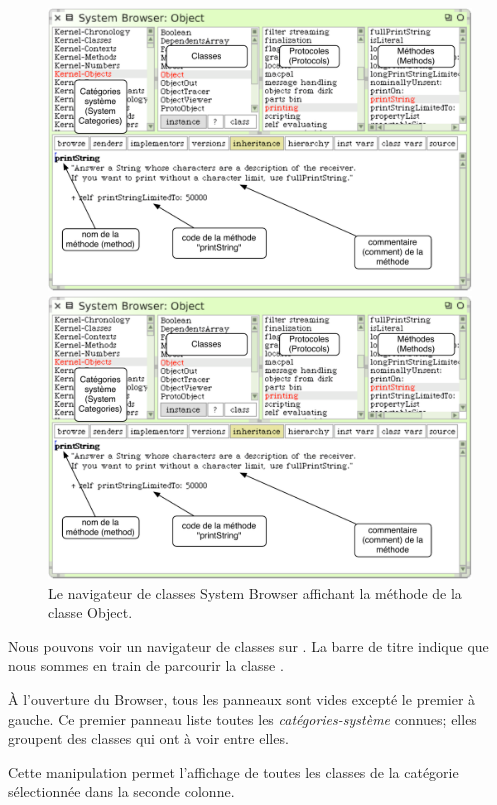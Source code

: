 \documentclass[a4paper,10pt,twoside]{book}
\begin{document}
\begin{figure}[htb]
\ifluluelse
	{\centerline {\includegraphics[width=\textwidth]{ClassBrowser1}}}
	{\centerline {\includegraphics[scale=0.7]{ClassBrowser1}}}
\caption{Le navigateur de classes System Browser affichant la
  m\'ethode  de la classe Object.
\label{fig:classBrowser}}
\end{figure}

Nous pouvons voir un navigateur de classes sur .
La barre de titre indique que nous sommes en train de parcourir la
classe .

\`A l'ouverture du Browser, tous les panneaux sont vides except\'e
le premier \`a gauche.
Ce premier panneau liste toutes les \emph{cat\'egories-syst\`eme}
connues; elles groupent des classes qui ont à voir entre elles.

Cette manipulation permet l'affichage de toutes les
classes de la cat\'egorie s\'electionn\'ee dans la seconde colonne.
\end{document}
